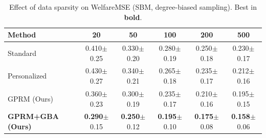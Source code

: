 \documentclass{article}
\theoremstyle{plain}
\theoremstyle{definition}
\theoremstyle{remark}
\begin{document}
\begin{table}[h]
\caption{Effect of data sparsity on WelfareMSE (SBM, degree-biased sampling). Best in \textbf{bold}.}
\label{tab:sparsity-ablation}
\centering
\small
\begin{tabular}{lccccc}
\toprule
\textbf{Method} & \textbf{20} & \textbf{50} & \textbf{100} & \textbf{200} & \textbf{500} \\
\midrule
Standard & 0.410{\tiny$\pm$0.25} & 0.330{\tiny$\pm$0.20} & 0.280{\tiny$\pm$0.19} & 0.250{\tiny$\pm$0.18} & 0.230{\tiny$\pm$0.17} \\
Personalized & 0.430{\tiny$\pm$0.27} & 0.340{\tiny$\pm$0.21} & 0.265{\tiny$\pm$0.18} & 0.235{\tiny$\pm$0.17} & 0.212{\tiny$\pm$0.16} \\
GPRM (Ours) & 0.360{\tiny$\pm$0.23} & 0.300{\tiny$\pm$0.19} & 0.235{\tiny$\pm$0.17} & 0.210{\tiny$\pm$0.16} & 0.195{\tiny$\pm$0.15} \\
\textbf{GPRM+GBA (Ours)} & \textbf{0.290}{\tiny$\pm$0.15} & \textbf{0.250}{\tiny$\pm$0.12} & \textbf{0.195}{\tiny$\pm$0.10} & \textbf{0.175}{\tiny$\pm$0.08} & \textbf{0.158}{\tiny$\pm$0.06} \\
\bottomrule
\end{tabular}
\end{table}
\end{document}
